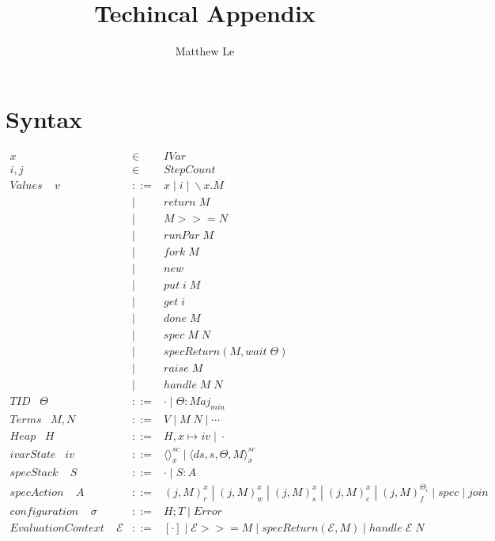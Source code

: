\documentclass[9pt]{article}
\title{Techincal Appendix}
\author{Matthew Le}
\begin{document}
\maketitle

\section{Syntax}

\begin{displaymath}
\begin{array}{rcll}
x &\in& IVar \\
i, j &\in& StepCount  \\ 

Values \;\;\;\; v & ::= & x \; | \; i \; | \; \backslash x. M \\
& | & return \; M\\ 
& | & M >>= N\\
& | & runPar \; M \\
& | & fork \; M \\
& | & new \\
& | & put \; i \; M \\
& | & get \; i \\ 
& | & done \; M \\
& | & spec \; M \; N \\
& | & specReturn(M, wait \; \Theta) \\
& | & raise \; M \\
& | & handle \; M \; N  \\

TID \;\;\; \Theta &::=& \cdot \; | \; \Theta : Maj_{min} \\

Terms \;\;\; M, N &::=&  V \;| \;M \; N \; | \; \cdots\\

Heap \;\;\; H &::=& H, x \mapsto iv \; | \; \cdot \\

ivarState \;\;\; iv &::=& \langle\rangle_x^{sc} \; | \; \langle ds, s, \Theta, M\rangle_x^{sc}\\

specStack \;\;\;\; S &::=& \cdot \; | \; S : A\; \\
specAction \;\;\;\; A &::=& (j, M)_r^x \; | \; (j, M)_w^x \; | \; (j, M)_s^x \; | \; (j, M)_c^x \; | \; (j, M)_f^{\Theta_i} \; | \; spec \; | \; join\\

configuration \;\;\;\; \sigma &::=& H; T \; | \; Error\\

Evaluation Context \;\;\;\; \mathcal{E} &::=& [\cdot] \; | \; \mathcal{E} >>= M \; | \; specReturn(\mathcal{E}, M) \; | \; handle \; \mathcal{E} \; N
\end{array}
\end{displaymath}
\end{document}

